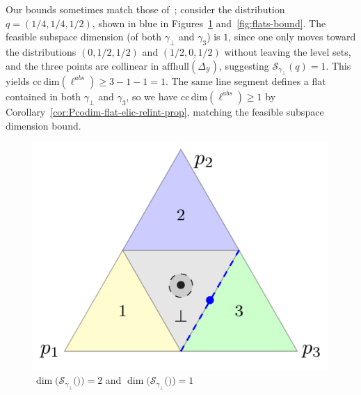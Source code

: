 \documentclass[anon,12pt]{colt2021} %
\newcommand{\simplex}{\Delta_\Y}
\newcommand{\ccdim}{\mathrm{cc\,dim}}
\newcommand{\affhull}{\mathrm{affhull}}
\newcommand{\Sc}{\mathcal{S}}  %
\newcommand{\Y}{\mathcal{Y}}
\begin{document}
Our bounds sometimes match those of~\citep{ramaswamy2016convex}; consider the distribution $q = (1/4, 1/4, 1/2)$, shown in blue in Figures~\ref{fig:fsd-bound} and~\ref{fig:flats-bound}.
The feasible subspace dimension (of both $\gamma_\bot$ and $\gamma_3$) is $1$, since one only moves toward the distributions $(0,1/2, 1/2)$ and $(1/2, 0, 1/2)$ without leaving the level sets, and the three points are collinear in $\affhull(\simplex)$, suggesting $\Sc_{\gamma_\bot}(q) = 1$.  
This yields $\ccdim(\ell^{abs}) \geq 3 - 1- 1 = 1$.
The same line segment defines a flat contained in both $\gamma_\bot$ and $\gamma_3$, so we have $\ccdim(\ell^{abs}) \geq 1$ by Corollary~\ref{cor:Pcodim-flat-elic-relint-prop}, matching the feasible subspace dimension bound.


\begin{figure}[ht]
\begin{minipage}{0.45\linewidth}
	\centering
	\includegraphics[width=\linewidth]{tikz/fsd-bound.pdf}
	\caption{%
		$\dim(\Sc_{\gamma_\bot}($\textbullet$)) = 2$ and $\dim(\Sc_{\gamma_\bot}(${\color{blue}\textbullet}$)) = 1$\vspace*{-5pt}}
	\label{fig:fsd-bound}
\end{minipage}
\hfill
\begin{minipage}{0.45\linewidth}
	\centering

\end{minipage}
\end{figure}
\end{document}
